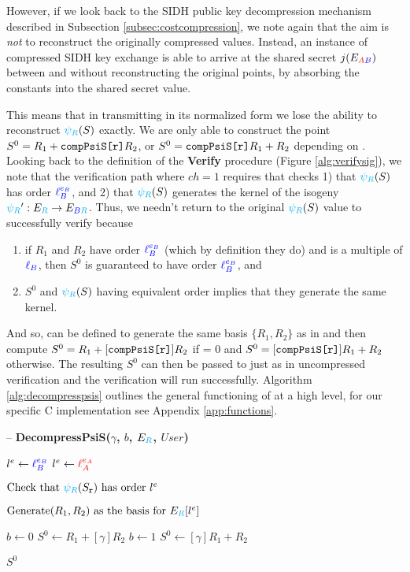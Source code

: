 However, if we look back to the SIDH public key decompression mechanism described in Subsection \ref{subsec:costcompression}, we note again that the aim is \textit{not} to reconstruct the originally compressed values. Instead, an instance of compressed SIDH key exchange is able to arrive at the shared secret $j(E_{\textcolor{red}{A}\textcolor{blue}{B}})$ between \alice and \bob without reconstructing the original points, by absorbing the constants into the shared secret value.

This means that in transmitting  in its normalized form we lose the ability to reconstruct $\textcolor{cyan}{\psi_R}(S)$ exactly. We are only able to construct the point $S^{0} = R_1 + \texttt{compPsiS[r]}R_2$, or $S^{0} = \texttt{compPsiS[r]}R_1 + R_2$ depending on . Looking back to the definition of the \textbf{Verify} procedure (Figure \ref{alg:verifysig}), we note that the verification path where $ch = 1$ requires that \alice checks 1) that $\textcolor{cyan}{\psi_R}(S)$ has order $\textcolor{blue}{\ell_{B}^{e_B}}$, and 2) that $\textcolor{cyan}{\psi_R}(S)$ generates the kernel of the isogeny $\textcolor{cyan}{\psi_R}' : E_{\textcolor{cyan}{R}} \rightarrow E_{\textcolor{blue}{B}\textcolor{cyan}{R}}$. Thus, we needn't return to the original $\textcolor{cyan}{\psi_R}(S)$ value to successfully verify because
\begin{enumerate}
\item if $R_1$ and $R_2$ have order $\textcolor{blue}{\ell_{B}^{e_B}}$ (which by definition they do) and  is a multiple of $\textcolor{blue}{\ell_{B}}$, then $S^{0}$ is guaranteed to have order $\textcolor{blue}{\ell_{B}^{e_B}}$, and
\item $S^{0}$ and $\textcolor{cyan}{\psi_R}(S)$ having equivalent order implies that they generate the same kernel.
\end{enumerate}

And so,  can be defined to generate the same basis $\{R_1, R_2\}$ as in  and then compute $S^{0} = R_1 + [\texttt{compPsiS[r]}]R_2$ if  = 0 and $S^{0} = [\texttt{compPsiS[r]}]R_1 + R_2$ otherwise. The resulting $S^{0}$ can then be passed to   just as in uncompressed verification and the verification will run successfully. Algorithm \ref{alg:decompresspsis} outlines the general functioning of  at a high level, for our specific C implementation see Appendix \ref{app:functions}.

\begin{algorithm}
\caption{-- \textbf{DecompressPsiS($\gamma$, $b$, $E_{\textcolor{cyan}{R}}$, $User$)}}
\label{alg:decompresspsis}
\begin{algorithmic}[1]
	\State $l^e \gets \textcolor{blue}{\ell_{B}^{e_B}}$
\EndIf
{}
	\State $l^e \gets \textcolor{red}{\ell_{A}^{e_A}}$
\EndIf

\State $\text{Check that } \textcolor{cyan}{\psi_R}(S_{\texttt{r}}) \text{ has order } l^e$

\State $\text{Generate} (R_{1}, R_{2}) \text{ as the basis for } E_{\textcolor{cyan}{R}}[l^e]$

	\State $b \gets 0$
	\State $S^{0} \gets R_1 + [\gamma]R_2$
\Else
	\State $b \gets 1$
	\State $S^{0} \gets [\gamma]R_1 + R_2$
\EndIf

\State \Return $S^{0}$
\end{algorithmic}
\end{algorithm}

